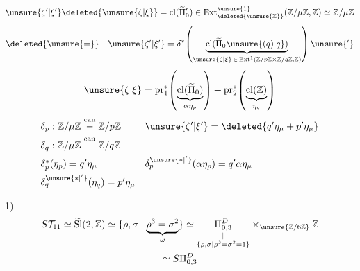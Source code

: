 \[
 \unsure{\zeta'|\xi'}\deleted{\unsure{\zeta|\xi}}=
 \mathrm{cl}(\widetilde\Pi'_0)\in
 \operatorname{Ext}^{\unsure{1}}_{\deleted{\unsure{\mathbb Z}}}
 (\mathbb Z/\mu\mathbb Z,\mathbb Z)\simeq\mathbb Z/\mu\mathbb Z
\]
\[
 \deleted{\unsure{=}}\quad
 \unsure{\zeta'|\xi'}=
 \delta^*\!\left(
 \underbrace{\mathrm{cl}(\widetilde\Pi_0\unsure{(q)|q})}_{\unsure{\zeta|\xi}\,\in\,\operatorname{Ext}^1(\mathbb Z/p\mathbb Z\times\mathbb Z/q\mathbb Z,\mathbb Z)}
 \right)\unsure{'}
\]
\[
 \unsure{\zeta|\xi}=
 \mathrm{pr}_1^*\!\left(\underbrace{\mathrm{cl}(\widetilde\Pi_0)}_{\alpha\eta_p}\right)
 +\mathrm{pr}_2^*\!\left(\underbrace{\mathrm{cl}(\mathbb Z)}_{\eta_q}\right)
\]
\[
\begin{array}{ll}
 \delta_p:\mathbb Z/\mu\mathbb Z\mathrel{\overset{\mathrm{can}}{-}}\mathbb Z/p\mathbb Z
 &\unsure{\zeta'|\xi'}=\deleted{q'\eta_\mu+p'\eta_\mu}\\[1ex]
 \delta_q:\mathbb Z/\mu\mathbb Z\mathrel{\overset{\mathrm{can}}{-}}\mathbb Z/q\mathbb Z&\\[1ex]
 \delta_p^*(\eta_p)=q'\eta_\mu & \delta_p^{\unsure{*|' }}(\alpha\eta_p)=q'\alpha\eta_\mu\\[1ex]
 \delta_q^{\unsure{*|'}}(\eta_q)=p'\eta_\mu &
\end{array}
\]


1)
\[
\begin{gathered}
 S\mathcal T_{11}\simeq\widetilde{\mathrm{Sl}}(2,\mathbb Z)
 \simeq\{\rho,\sigma\mid\underbrace{\rho^3=\sigma^2}_{\omega}\}
 \simeq
 \underset{\substack{\Vert\\\{\rho,\sigma\mid\rho^3=\sigma^2=1\}}}{\Pi_{0,3}^D}
 \times_{\unsure{\mathbb Z/6\mathbb Z}}\mathbb Z\\
 \simeq S\Pi_{0,3}^D
\end{gathered}
\]

